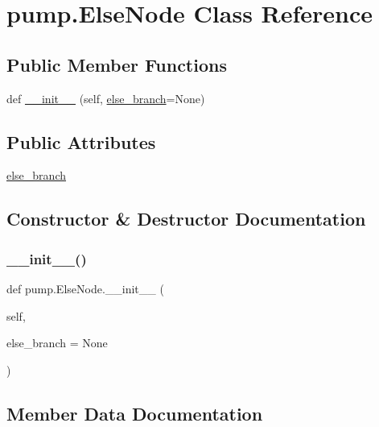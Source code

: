 \hypertarget{classpump_1_1ElseNode}{}\section{pump.\+Else\+Node Class Reference}
\label{classpump_1_1ElseNode}
\subsection*{Public Member Functions}
\begin{DoxyCompactItemize}
\item 
def \mbox{\hyperlink{classpump_1_1ElseNode_a7489ff8c6c7ddfe6bd6593b8ecccd819}{\+\_\+\+\_\+init\+\_\+\+\_\+}} (self, \mbox{\hyperlink{classpump_1_1ElseNode_ac838a0fe9f5d713c7f56939eed5e128d}{else\+\_\+branch}}=None)
\end{DoxyCompactItemize}
\subsection*{Public Attributes}
\begin{DoxyCompactItemize}
\item 
\mbox{\hyperlink{classpump_1_1ElseNode_ac838a0fe9f5d713c7f56939eed5e128d}{else\+\_\+branch}}
\end{DoxyCompactItemize}


\subsection{Constructor \& Destructor Documentation}
\mbox{\label{classpump_1_1ElseNode_a7489ff8c6c7ddfe6bd6593b8ecccd819}} 
\subsubsection{\texorpdfstring{\_\_init\_\_()}{\_\_init\_\_()}}
{\footnotesize\ttfamily def pump.\+Else\+Node.\+\_\+\+\_\+init\+\_\+\+\_\+ (\begin{DoxyParamCaption}\item[{}]{self,  }\item[{}]{else\+\_\+branch = {\ttfamily None} }\end{DoxyParamCaption})}



\subsection{Member Data Documentation}
\mbox{\label{classpump_1_1ElseNode_ac838a0fe9f5d713c7f56939eed5e128d}} 
